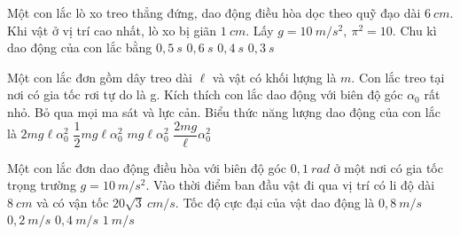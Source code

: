 	\begin{ex}%
		Một con lắc lò xo treo thẳng đứng, dao động điều hòa dọc theo quỹ đạo dài $6\ cm$. Khi vật ở vị trí cao nhất, lò xo bị giãn $1\ cm$. Lấy $g = 10\ m/s^2,\ \pi^2 = 10$. Chu kì dao động của con lắc bằng
		\choice
		{$0,5\ s$}
		{$0,6\ s$}
		{\True $0,4\ s$}
		{$0,3\ s$}
	\end{ex}
	\begin{ex} %
		Một con lắc đơn gồm dây treo dài $\ell$ và vật có khối lượng là $m$. Con lắc treo tại nơi có gia tốc rơi tự do là g. Kích thích con lắc dao động với biên độ góc $\alpha _0$ rất nhỏ. Bỏ qua mọi ma sát và lực cản. Biểu thức năng lượng dao động của con lắc là
		\choice
		{$2mg\ell\alpha _0^2$}
		{\True $\dfrac{1}{2}{mg\ell}\alpha _0^2$}
		{$mg\ell\alpha _0^2$}
		{$\dfrac{2mg}{\ell}\alpha _0^2$}
	\end{ex}
	\begin{ex} %
		Một con lắc đơn dao động điều hòa với biên độ góc $0,1\ rad$ ở một nơi có gia tốc trọng trường $g = 10\ m/s^2$. Vào thời điểm ban đầu vật đi qua vị trí có li độ dài $8\ cm$ và có vận tốc $20\sqrt{3}\ cm/s$. Tốc độ cực đại của vật dao động là
		\choice
		{$0,8\ m/s$}
		{$0,2\ m/s$}
		{\True $0,4\ m/s$}
		{$1\ m/s$}
	\end{ex}
	

